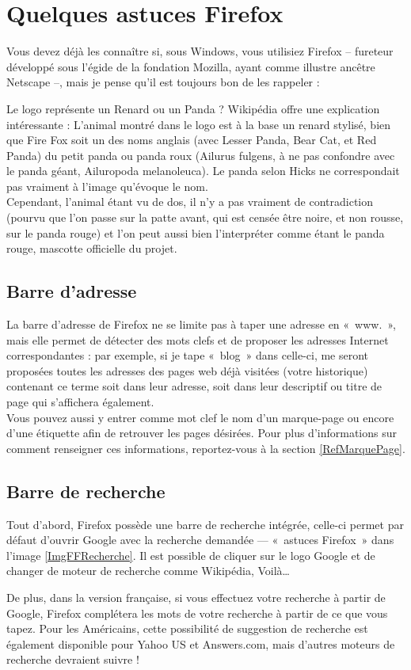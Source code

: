 \section{Quelques astuces Firefox}
\label{RefFF}
Vous devez déjà les connaître si, sous Windows, vous utilisiez Firefox -- fureteur développé sous l'égide de la fondation Mozilla, ayant comme illustre ancêtre Netscape --, mais je pense qu'il est toujours bon de les rappeler :
\begin{citationlongue}{Le logo représente un Renard ou un Panda ? Wikipédia offre une explication intéressante :}
L'animal montré dans le logo est à la base un renard stylisé, bien que Fire Fox soit un des noms anglais (avec Lesser Panda, Bear Cat, et Red Panda) du petit panda ou panda roux (Ailurus fulgens, à ne pas confondre avec le panda géant, Ailuropoda melanoleuca). Le panda selon Hicks ne correspondait pas vraiment à l'image qu'évoque le nom.\\ Cependant, l'animal étant vu de dos, il n'y a pas vraiment de contradiction (pourvu que l'on passe sur la patte avant, qui est censée être noire, et non rousse, sur le panda rouge) et l'on peut aussi bien l'interpréter comme étant le panda rouge, mascotte officielle du projet.
\end{citationlongue}
\subsection{Barre d'adresse}
\label{RefBarreAdresse}
La barre d'adresse de Firefox ne se limite pas à taper une adresse en «~www.~», mais elle permet de détecter des mots clefs et de proposer les adresses Internet correspondantes : par exemple, si je tape «~blog~» dans celle-ci, me seront proposées toutes les adresses des pages web déjà visitées (votre historique) contenant ce terme soit dans leur adresse, soit dans leur descriptif ou titre de page qui s'affichera également.\\
Vous pouvez aussi y entrer comme mot clef le nom d'un marque-page ou encore d'une étiquette afin de retrouver les pages désirées. Pour plus d'informations sur comment renseigner ces informations, reportez-vous à la section \ref{RefMarquePage}.\par
\subsection{Barre de recherche}
Tout d'abord, Firefox possède une barre de recherche intégrée, celle-ci permet par défaut d'ouvrir Google avec la recherche demandée --- «~astuces Firefox~» dans l'image \ref{ImgFFRecherche}. Il est possible de cliquer sur le logo Google et de changer de moteur de recherche comme Wikipédia, Voilà\ldots{}\par
{}
De plus, dans la version française, si vous effectuez votre recherche à partir de Google, Firefox complétera les mots de votre recherche à partir de ce que vous tapez. Pour les Américains, cette possibilité de suggestion de recherche est également disponible pour Yahoo US et Answers.com, mais d'autres moteurs de recherche devraient suivre !
